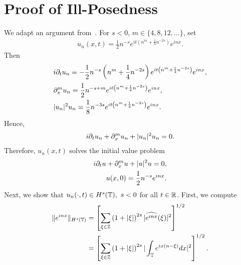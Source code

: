 \section{Proof of Ill-Posedness}
We adapt an argument from~\cite{Burq_Gerad_Tzvetkov-An-instability-}. For $s<0$,
$m \in \{4, 8, 12, \dots\}$, set
%
%
%
%
\begin{equation}
	\label{nill-soln}
	\begin{split}
		u_{n}(x,t)=\frac{1}{2 }n^{-s}e^{it\left( n^{m}+\frac{1}{4}n^{-2s}
		\right)}e^{inx}.
	\end{split}
\end{equation}
%
%
Then
%
%
\begin{equation*}
	\begin{split}
		& i \partial_t u_{n}
		= -\frac{1}{2 }n^{-s}\left( n^{m}+\frac{1}{4}n^{-2s} \right)e^{it\left(
		n^{m}+ \frac{1}{4}n^{-2s} \right)}e^{inx},
		\\
		& \partial_x^{m}u_{n}  = \frac{1}{2 }n^{-s+m}e^{it\left(
		n^{m}+\frac{1}{4}n^{-2s} \right)}e^{inx},
		\\
		& | u_{n} |^{2}u_{n}  = \frac{1}{8 }n^{-3s}e^{it\left(
		n^{m}+\frac{1}{4}n^{-2s} \right)}e^{inx}.
	\end{split}
\end{equation*}
%
%
Hence,
%
%
\begin{equation*}
	\begin{split}
		i \partial_t u_{n} + \partial_x^{m}u_{n} + | u_{n} |^{2} u_{n}
		=0.
	\end{split}
\end{equation*}
%
%
Therefore, $u_{n}(x,t)$ solves the initial value problem
%
%
\begin{gather*}
	\begin{split}
		i \partial_t u + \partial_x^m u + | u |^{2}u = 0,
		\\
    u(x,0) = \frac{1}{2 }n^{-s}e^{inx}.
	\end{split}
\end{gather*}
%
%
Next, we show that $u_{n}(\cdot, t) \in H^{s}(\mathbb{T}), \text{ } s < 0$ for all $t
\in \mathbb{R}$.  First, we compute
%
%
\begin{equation*}
	\begin{split}
		\|e^{inx}\|_{H^{s}(\mathbb{T})}
		& =  \left[ \sum_{\xi \in \mathbb{Z}} \left( 1+ | \xi |
		\right)^{2s} | \widehat{e^{inx}}(\xi) |^{2} \right]^{1/2}
		\\
		& =  \left[ \sum_{\xi \in \mathbb{Z}} \left( 1 + | \xi | \right)^{2s} |
		\int_{\mathbb{T}}e^{ix(n- \xi)}dx |^{2}\right]^{1/2}.
	\end{split}
\end{equation*}
